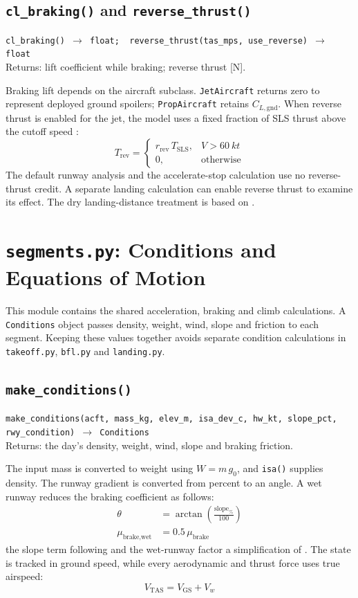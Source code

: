 \documentclass[11pt,letterpaper]{article}
\numberwithin{equation}{section}
\newcommand{\func}[2]{\begin{funcbox}\texttt{#1}\\[2pt]{\color{ink3}Returns:} #2\end{funcbox}}
\newcommand{\code}[1]{\textmd{\texttt{#1}}}
\begin{document}
\subsection{\code{cl\_braking()} and \code{reverse\_thrust()}}
\func{cl\_braking() $\rightarrow$ float;\ \ reverse\_thrust(tas\_mps, use\_reverse) $\rightarrow$ float}{lift coefficient while braking; reverse thrust [N].}
Braking lift depends on the aircraft subclass. \code{JetAircraft} returns zero to represent deployed ground spoilers; \code{PropAircraft} retains $C_{L,\text{gnd}}$. When reverse thrust is enabled for the jet, the model uses a fixed fraction of SLS thrust above the cutoff speed \cite{AIRBUS-GTG}:
\begin{equation}
T_\text{rev} =
\begin{cases}
r_\text{rev}\,T_\text{SLS}, & V > \SI{60}{kt}\\
0, & \text{otherwise}
\end{cases} \label{eq:Trev}
\end{equation}
The default runway analysis and the accelerate-stop calculation use no reverse-thrust credit. A separate landing calculation can enable reverse thrust to examine its effect. The dry landing-distance treatment is based on \cite[\S25.125]{14CFR25}.

\section{\code{segments.py}: Conditions and Equations of Motion}\label{sec:segments}
This module contains the shared acceleration, braking and climb calculations. A \code{Conditions} object passes density, weight, wind, slope and friction to each segment. Keeping these values together avoids separate condition calculations in \code{takeoff.py}, \code{bfl.py} and \code{landing.py}.

\subsection{\code{make\_conditions()}}
\func{make\_conditions(acft, mass\_kg, elev\_m, isa\_dev\_c, hw\_kt, slope\_pct, rwy\_condition) $\rightarrow$ Conditions}{the day's density, weight, wind, slope and braking friction.}
The input mass is converted to weight using $W=m\,g_0$, and \code{isa()} supplies density. The runway gradient is converted from percent to an angle. A wet runway reduces the braking coefficient as follows:
\begin{align}
\theta &= \arctan\left(\frac{\text{slope}_\%}{100}\right) \label{eq:slope}\\
\mu_\text{brake,wet} &= 0.5\,\mu_\text{brake} \label{eq:mu-wet}
\end{align}
the slope term following \cite{OJHA} and the wet-runway factor a simplification of \cite{AIRBUS-GTG}. The state is tracked in ground speed, while every aerodynamic and thrust force uses true airspeed:
\begin{equation}
V_\text{TAS} = V_\text{GS} + V_w \label{eq:tas}
\end{equation}
\end{document}
